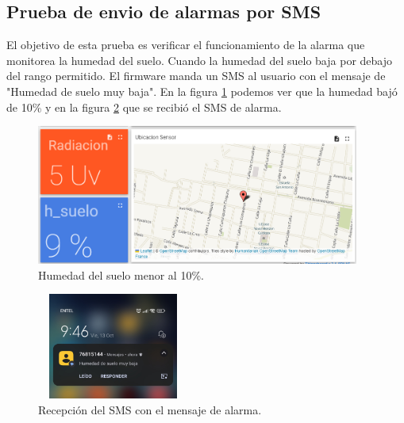 \subsection{Prueba de envio de alarmas por SMS}
El objetivo de esta prueba es verificar el funcionamiento de la alarma que monitorea la humedad del suelo.
Cuando la humedad del suelo baja por debajo del rango permitido. El firmware manda un SMS al usuario con el mensaje de "Humedad de suelo muy baja". En la figura \ref{fig:humedad menor} podemos ver que la humedad bajó de 10\% y en la figura \ref{fig:sms alarma} que se recibió el SMS de alarma.

\begin{figure}[h!]
  \centering
    \includegraphics[width=\linewidth, height=4.6cm]{./Figures/humedad_menor2.png}
  \caption{Humedad del suelo menor al 10\%.}
    \label{fig:humedad menor}
\end{figure}

\begin{figure}[h!]
  \centering
    \includegraphics[width=5cm, height=3.5cm]{./Figures/sms_alarma2.jpg}
  \caption{Recepción del SMS con el mensaje  de alarma.}
    \label{fig:sms alarma}
\end{figure}

\label{sec:pruebasHW}

